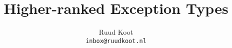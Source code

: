 \documentclass{llncs}
\begin{document}







\title{Higher-ranked Exception Types}
\author{Ruud Koot\\\texttt{inbox@ruudkoot.nl}}


\end{document}
